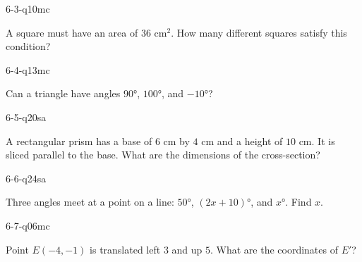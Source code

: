 \begin{practiceQuestion}{6-3-q10}{mc}
\begin{questionText}
A square must have an area of $36$ cm$^2$. How many different squares satisfy this condition?
\end{questionText}
\end{practiceQuestion}

\begin{practiceQuestion}{6-4-q13}{mc}
\begin{questionText}
Can a triangle have angles $90°$, $100°$, and $-10°$?
\end{questionText}
\end{practiceQuestion}

\begin{practiceQuestion}{6-5-q20}{sa}
\begin{questionText}
A rectangular prism has a base of $6$ cm by $4$ cm and a height of $10$ cm. It is sliced parallel to the base. What are the dimensions of the cross-section?
\end{questionText}
\end{practiceQuestion}

\begin{practiceQuestion}{6-6-q24}{sa}
\begin{questionText}
Three angles meet at a point on a line: $50°$, $(2x + 10)°$, and $x°$. Find $x$.
\end{questionText}
\end{practiceQuestion}

\begin{practiceQuestion}{6-7-q06}{mc}
\begin{questionText}
Point $E(-4, -1)$ is translated left $3$ and up $5$. What are the coordinates of $E'$?
\end{questionText}
\end{practiceQuestion}

